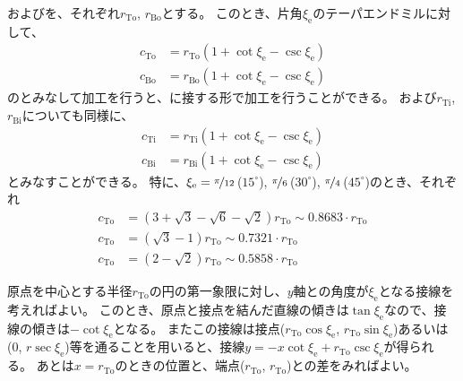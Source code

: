 \TopEndFaceOutRoundChamferRadius および\BottomEndFaceOutRoundChamferRadius を、それぞれ$r_\mathrm{To}$, $r_\mathrm{Bo}$とする。
このとき、片角$\xi_\mathrm e$のテーパエンドミルに対して、
\begin{align*}
  c_\mathrm{To} &= r_\mathrm{To}\left(1+\cot\xi_\mathrm e-\csc\xi_\mathrm e\right)\\
  c_\mathrm{Bo} &= r_\mathrm{Bo}\left(1+\cot\xi_\mathrm e-\csc\xi_\mathrm e\right)
\end{align*}
の\EndFaceOutChamferLength とみなして加工を行うと、\EndFaceRoundChamfer に接する形で加工を行うことができる。
\TopEndFaceInRoundChamferRadius および\BottomFaceInRoundChamferRadius$r_\mathrm{Ti}$, $r_\mathrm{Bi}$についても同様に、
\begin{align*}
  c_\mathrm{Ti} &= r_\mathrm{Ti}\left(1+\cot\xi_\mathrm e-\csc\xi_\mathrm e\right)\\
  c_\mathrm{Bi} &= r_\mathrm{Bi}\left(1+\cot\xi_\mathrm e-\csc\xi_\mathrm e\right)
\end{align*}
とみなすことができる。
特に、$\xi_\mathrm e = \nicefrac\pi{12}$\,($15^\circ$), $\nicefrac\pi6$\,($30^\circ$), $\nicefrac\pi4$\,($45^\circ$)のとき、それぞれ
\begin{align*}
  c_\mathrm{To} &= \left(3+\sqrt3-\sqrt6-\sqrt2\right)r_\mathrm{To} \sim 0.8683\cdot r_\mathrm{To}\\
  c_\mathrm{To} &= \left(\sqrt3-1\right)r_\mathrm{To} \sim 0.7321\cdot r_\mathrm{To}\\
  c_\mathrm{To} &= \left(2-\sqrt2\right)r_\mathrm{To} \sim 0.5858\cdot r_\mathrm{To}
\end{align*}
\begin{hosoku}
原点を中心とする半径$r_\mathrm{To}$の円の第一象限に対し、$y$軸との角度が$\xi_\mathrm e$となる接線を考えればよい。
このとき、原点と接点を結んだ直線の傾きは$\tan\xi_\mathrm e$なので、接線の傾きは$-\cot\xi_\mathrm e$となる。
またこの接線は接点($r_\mathrm{To}\cos\xi_\mathrm e$, $r_\mathrm{To}\sin\xi_\mathrm e$)あるいは(0, $r\sec\xi_\mathrm e$)等を通ることを用いると、接線$y = -x\cot\xi_\mathrm e+r_\mathrm{To}\csc\xi_\mathrm e$が得られる。
あとは$x = r_\mathrm{To}$のときの位置と、端点($r_\mathrm{To}$, $r_\mathrm{To}$)との差をみればよい。
\end{hosoku}



